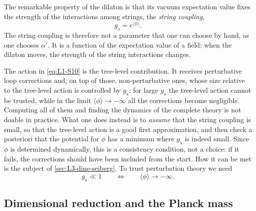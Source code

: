 The remarkable property of the dilaton is that its vacuum expectation value fixes the strength of the interactions among strings, the \emph{string coupling},
\begin{equation}
  g_s = e^{\langle\phi\rangle} .
  \label{eq:L1-gs}
\end{equation}
The string coupling is therefore not a parameter that one can choose by hand, as one chooses $\alpha'$. It is a function of the expectation value of a field: when the dilaton moves, the strength of the string interactions changes.

The action in \cref{eq:L1-S10} is the tree-level contribution. It receives perturbative loop corrections and, on top of those, non-perturbative ones, whose size relative to the tree-level action is controlled by $g_s$: for large $g_s$ the tree-level action cannot be trusted, while in the limit $\langle\phi\rangle\to-\infty$ all the corrections become negligible. Computing all of them and finding the dynamics of the complete theory is not doable in practice. What one does instead is to \emph{assume} that the string coupling is small, so that the tree-level action is a good first approximation, and then check a posteriori that the potential for $\phi$ has a minimum where $g_s$ is indeed small. Since $\phi$ is determined dynamically, this is a consistency condition, not a choice: if it fails, the corrections should have been included from the start. How it can be met is the subject of \cref{sec:L3-dine-seiberg}. To trust perturbation theory we need
\begin{equation}
  g_s \ll 1 \qquad\Longleftrightarrow\qquad \langle\phi\rangle \to -\infty .
  \label{eq:L1-weak}
\end{equation}

\subsection{Dimensional reduction and the Planck mass}

